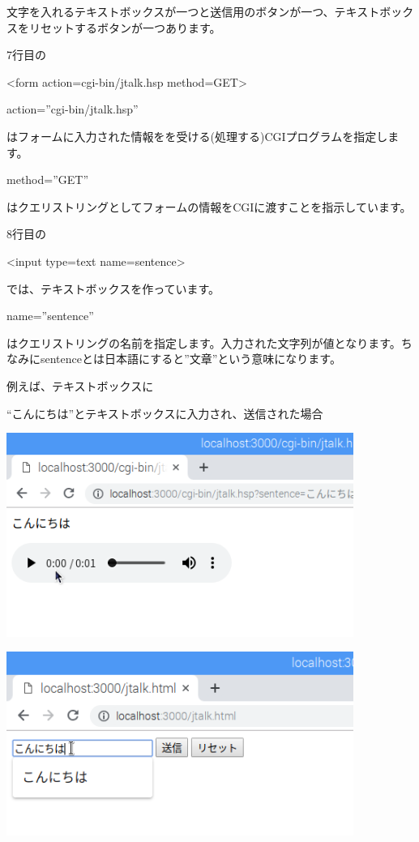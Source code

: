 \documentclass[a4paper,12pt,dvipdfmx]{jarticle}
\begin{document}
文字を入れるテキストボックスが一つと送信用のボタンが一つ、テキストボックスをリセットするボタンが一つあります。

%


7行目の

{\textless}form action={\textquotedbl}cgi-bin/jtalk.hsp{\textquotedbl}
method={\textquotedbl}GET{\textquotedbl}{\textgreater}

action=”cgi-bin/jtalk.hsp”

はフォームに入力された情報をを受ける(処理する)CGIプログラムを指定します。

method=”GET”

はクエリストリングとしてフォームの情報をCGIに渡すことを指示しています。

8行目の

{\textless}input type={\textquotedbl}text{\textquotedbl} name={\textquotedbl}sentence{\textquotedbl}{\textgreater}

では、テキストボックスを作っています。

name=”sentence”

はクエリストリングの名前を指定します。入力された文字列が値となります。ちなみにsentenceとは日本語にすると”文章”という意味になります。

例えば、テキストボックスに

“こんにちは”とテキストボックスに入力され、送信された場合

\clearpage
\bigskip



\centering
\includegraphics[width=0.85\textwidth]{ome7-img057.png}

\centering
\includegraphics[width=0.85\textwidth]{ome7-img056.png}
\flushleft
\end{document}
